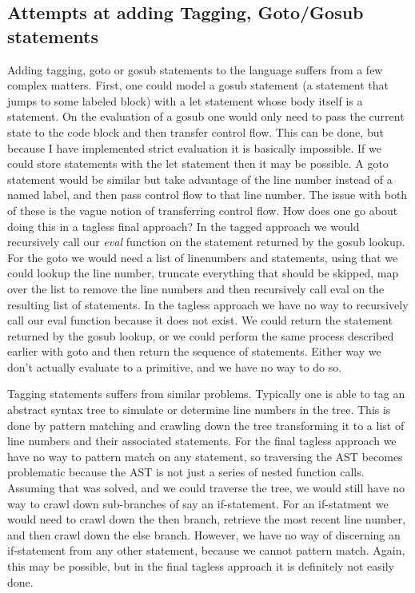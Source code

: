 \documentclass[9pt,letterpaper]{extarticle}
\begin{document}
  \subsection{Attempts at adding Tagging, Goto/Gosub statements}
  Adding tagging, goto or gosub statements to the language suffers from a few
  complex matters. First, one could model a gosub statement (a statement that
  jumps to some labeled block) with a let statement whose body itself is a
  statement. On the evaluation of a gosub one would only need to pass the
  current state to the code block and then transfer control flow. This can be
  done, but because I have implemented strict evaluation it is basically
  impossible. If we could store statements with the let statement then it may
  be possible. A goto statement would be similar but take advantage of the line
  number instead of a named label, and then pass control flow to that line
  number. The issue with both of these is the vague notion of transferring
  control flow. How does one go about doing this in a tagless final approach? In
  the tagged approach we would recursively call our \textit{eval} function on
  the statement returned by the gosub lookup. For the goto we would need a list
  of linenumbers and statements, using that we could lookup the line number,
  truncate everything that should be skipped, map over the list to remove the
  line numbers and then recursively call eval on the resulting list of
  statements. In the tagless approach we have no way to recursively call our
  eval function because it does not exist. We could return the statement
  returned by the gosub lookup, or we could perform the same process described
  earlier with goto and then return the sequence of statements. Either way we
  don't actually evaluate to a primitive, and we have no way to do so. 

  Tagging statements suffers from similar problems. Typically one is able to tag
  an abstract syntax tree to simulate or determine line numbers in the tree.
  This is done by pattern matching and crawling down the tree transforming it to
  a list of line numbers and their associated statements. For the final tagless
  approach we have no way to pattern match on any statement, so traversing the
  AST becomes problematic because the AST is not just a series of nested
  function calls. Assuming that was solved, and we could traverse the tree, we
  would still have no way to crawl down sub-branches of say an if-statement. For
  an if-statment we would need to crawl down the then branch, retrieve the most
  recent line number, and then crawl down the else branch. However, we have no
  way of discerning an if-statement from any other statement, because we cannot
  pattern match. Again, this may be possible, but in the final tagless approach
  it is definitely not easily done.
\end{document}
